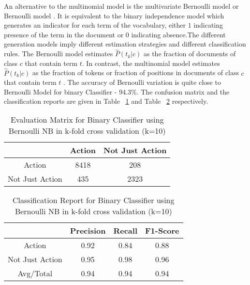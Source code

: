 \documentclass[11pt,letterpaper]{article}
\begin{document}
An alternative to the multinomial model is the multivariate Bernoulli model or Bernoulli model . It is equivalent to the binary independence model  which generates an indicator for each term of the vocabulary, either  $1$ indicating presence of the term in the document or $0$ indicating absence.The different generation models imply different estimation strategies and different classification rules. The Bernoulli model estimates  $\hat{P}(t_k|c)$ as the fraction of documents of class $c$ that contain term $t$. In contrast, the multinomial model estimates  $\hat{P}(t_k|c)$ as the fraction of tokens or fraction of positions in documents of class $c$ that contain term $t$ . The accuracy of Bernoulli variation is quite close to Bernoulli Model for binary Classifier - 94.3\%. The confusion matrix and the classification reports are given in Table ~\ref{Evalution Matrix for Binary Classifier using Bernoulli NB} and Table ~\ref{Classification Report for Binary Classifier using Bernoulli NB} respectively.\\
\begin{table}
\caption{Evaluation Matrix for Binary Classifier using Bernoulli NB in k-fold cross validation (k=10)} \label{Evalution Matrix for Binary Classifier using Bernoulli NB}
\begin{center}
\begin{tabular}{ |c|c|c| } 
 \hline
  & Action & Not Just Action \\ 
 \hline
 Action & 8418 & 208 \\ 
 Not Just Action & 435 & 2323 \\ 
 \hline
\end{tabular}
\end{center}
\end{table}

\begin{table}
\caption{Classification Report for Binary Classifier using Bernoulli NB in k-fold cross validation (k=10)} \label{Classification Report for Binary Classifier using Bernoulli NB}
\begin{center}
\begin{tabular}{ |c|c|c|c| } 
 \hline
  & Precision & Recall & F1-Score \\ 
 \hline
 Action & 0.92 & 0.84 & 0.88 \\ 
 Not Just Action & 0.95 & 0.98 & 0.96 \\ 
 Avg/Total & 0.94 & 0.94 & 0.94 \\
 \hline
\end{tabular}
\end{center}
\end{table}
\end{document}
